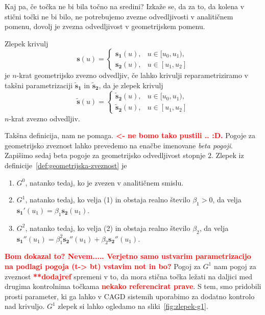 \documentclass[isrm2, tisk]{fmfdelo}
\newcommand{\mycomment}[1]{\textbf{\textcolor{red}{#1}}}
\begin{document}
    Kaj pa, če točka ne bi bila točno na sredini?
    Izkaže se, da za to, da kolena v stični točki ne bi bilo, ne potrebujemo zvezne odvedljivosti v analitičnem pomenu, dovolj je zvezna odvedljivost v geometrijskem pomenu.
    \begin{definicija}
        \label{def:geometrijska-zveznost}
        Zlepek krivulj \[\mathbf{s}(u) = \begin{cases}
                                             \mathbf{s_1}(u), & u \in [u_0,u_1),  \\
                                             \mathbf{s_2}(u), & u \in [u_1,u_2]
        \end{cases}\] je $n$-krat geometrijsko zvezno odvedljiv, če lahko krivulji reparametriziramo v takšni parametrizaciji $\mathbf{\tilde{s}_1}$ in $\mathbf{\tilde{s}_2}$, da je zlepek krivulj
        \[\mathbf{\tilde{s}}(u) = \begin{cases}
                                      \mathbf{\tilde{s}_2}(u), & u \in [u_0,u_1),  \\
                                      \mathbf{\tilde{s}_2}(u), & u \in [u_1,u_2]
        \end{cases}\] $n$-krat zvezno odvedljiv.
    \end{definicija}
    Takšna definicija, nam ne pomaga. \mycomment{<- ne bomo tako pustili .. :D.}
    Pogoje za geometrijsko zveznost lahko prevedemo na enačbe imenovane \textit{beta pogoji}.
    Zapišimo sedaj beta pogoje za geometrijsko odvedljivost stopnje $2$.
    Zlepek iz definicije~\ref{def:geometrijska-zveznost} je
    \begin{enumerate}
        \item $G^0$, natanko tedaj, ko je zvezen v analitičnem smislu.
        \item $G^1$, natanko tedaj, ko velja (1) in obstaja realno število $\beta_1>0$, da velja $\mathbf{s_1'}(u_1) =\beta_1\mathbf{s_2}(u_1)$.
        \item $G^2$, natanko tedaj, ko velja (2) in obstaja realno število $\beta_2$, da velja $\mathbf{s_1''}(u_1) =\beta_1^2\mathbf{s_2''}(u_1) + \beta_2\mathbf{s_2''}(u_1)$.
    \end{enumerate}
    \mycomment{Bom dokazal to? Nevem..... Verjetno samo ustvarim parametrizacijo na podlagi pogoja (t-> bt) vstavim not in bo?}
    Pogoj za $G^1$ nam pogoj za zveznost \mycomment{**dodajref} spremeni v to, da mora stična točka ležati na daljici med drugima kontrolnima točkama \mycomment{nekako referencirat prave}.
    S tem, smo pridobili prosti parameter, ki ga lahko v CAGD sistemih uporabimo za dodatno kontrolo nad krivuljo.
    $G^1$ zlepek si lahko ogledamo na sliki~\ref{fig:zlepek-g1}.
\end{document}
